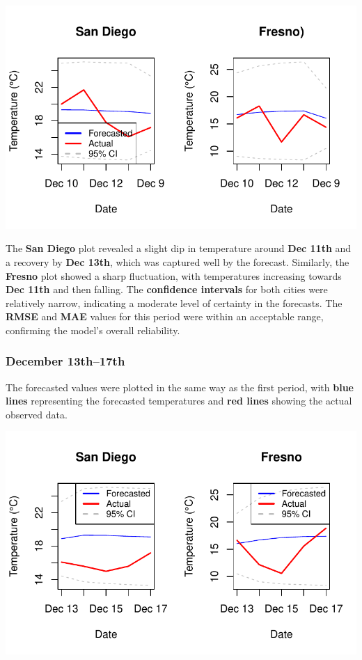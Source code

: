 \documentclass[
  11pt,
]{article}
\begin{document}
\includegraphics{project_files/figure-pdf/unnamed-chunk-88-1.pdf}

The \textbf{San Diego} plot revealed a slight dip in temperature around
\textbf{Dec 11th} and a recovery by \textbf{Dec 13th}, which was
captured well by the forecast. Similarly, the \textbf{Fresno} plot
showed a sharp fluctuation, with temperatures increasing towards
\textbf{Dec 11th} and then falling. The \textbf{confidence intervals}
for both cities were relatively narrow, indicating a moderate level of
certainty in the forecasts. The \textbf{RMSE} and \textbf{MAE} values
for this period were within an acceptable range, confirming the model's
overall reliability.

\subsubsection{December 13th--17th}\label{december-13th17th}

The forecasted values were plotted in the same way as the first period,
with \textbf{blue lines} representing the forecasted temperatures and
\textbf{red lines} showing the actual observed data.

\includegraphics{project_files/figure-pdf/unnamed-chunk-89-1.pdf}
\end{document}
